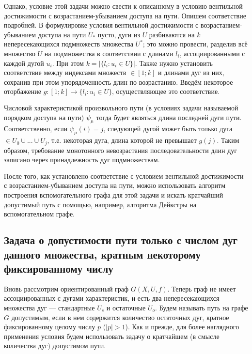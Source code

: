 Однако, условие этой задачи можно свести к описанному в \cite{Mono} условию вентильной достижимости с возрастанием-убыванием доступа на пути. Опишем соответствие подробней. В формулировке условия вентильной достижимости с возрастанием-убыванием доступа на пути $U_*$ пусто, дуги из $U$ разбиваются на $k$ непересекающихся подмножеств множества $U^*$; это можно провести, разделив всё множество $U$ на подмножества в соответствии с длинами $l_i$, ассоциированными с каждой дугой $u_i$. При этом $k = |\{ l_i : u_i \in U\}|$. Также нужно установить соответствие между индексами множеств $\in [1; k]$ и длинами дуг из них, сохранив при этом упорядоченность длин по возрастанию. Введём некоторое оторбажение $g:[1; k]\to \{ l_i : u_i \in U\}$, осуществляющее это соответствие. 

Числовой характеристикой произвольного пути (в условиях задачи называемой порядком доступа на пути) $\psi_\mu$ тогда будет являться длина последней дуги пути. Соответственно, если $\psi_\mu(i) = j$, следующей дугой может быть только дуга $\in U_0 \cup ... \cup U_j$, т.е. некоторая дуга, длина которой не превышает $g(j)$. Таким образом, требование монотонного невозрастания последовательности длин дуг записано через принадлежность дуг подмножествам. 

После того, как установлено соответствие с условием вентильной достижимости с возрастанием-убыванием доступа на пути, можно использовать алгоритм построения вспомогательного графа для этой задачи и искать кратчайший допустимый путь с помощью, например, алгоритма Дейкстры на вспомогательном графе. 

\subsection{Задача о допустимости пути только с числом дуг данного множества, кратным некоторому фиксированному числу}

Вновь рассмотрим ориентированный граф $G(X,U,f)$. Теперь граф не имеет ассоциированных с дугами характеристик, и есть два непересекающихся множества дуг --- стандартные $U_s$ и остаточные $U_o$. Будем называть путь на графе $G$ допустимым, если в нем содержится количество остаточных дуг, кратное фиксированному целому числу $p$ ($|p| > 1$). Как и прежде, для более наглядного применения условия будем использовать задачу о  кратчайшем (в смысле количества дуг) допустимом пути.

